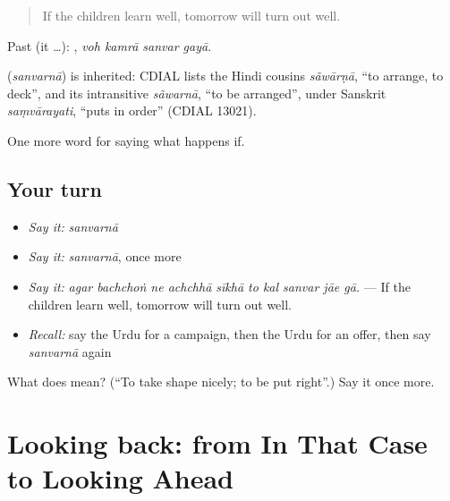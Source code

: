 \begin{quote}
If the children learn well, tomorrow will turn out well.
\end{quote}

Past (it …):    , \emph{voh kamrā sanvar gayā}.

\begin{cousinweb}
\textbf{} (\emph{sanvarnā}) is inherited: CDIAL lists the Hindi cousins \emph{sãwārṇā}, \textquotedblleft{}to arrange, to deck\textquotedblright{}, and its intransitive \emph{sãwarnā}, \textquotedblleft{}to be arranged\textquotedblright{}, under Sanskrit \emph{saṃvārayati}, \textquotedblleft{}puts in order\textquotedblright{} (CDIAL 13021).
\end{cousinweb}

\begin{grammarlens}[title={What you've built}]
One more word for saying what happens if.
\end{grammarlens}

\subsection*{Your turn}
\begin{itemize}
\raggedright
  \item \emph{Say it:} \emph{sanvarnā}
  \item \emph{Say it:} \emph{sanvarnā}, once more
  \item \emph{Say it:} \emph{agar bachchoṅ ne achchhā sīkhā to kal sanvar jāe gā.} — If the children learn well, tomorrow will turn out well.
  \item \emph{Recall:} say the Urdu for a campaign, then the Urdu for an offer, then say \emph{sanvarnā} again
\end{itemize}

\begin{tcolorbox}[breakable,colback=teal!4,colframe=teal!35!black,title={Before you move on}]
What does  mean? (\textquotedblleft{}To take shape nicely; to be put right\textquotedblright{}.) Say it once more.
\end{tcolorbox}
\section[(dialogue)]{Looking back: from In That Case to Looking Ahead}

\label{lesson:UR-R547-review-541-547}



